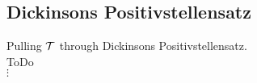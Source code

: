 \documentclass[./main.tex]{subfiles}
\begin{document}
\subsection{Dickinsons Positivstellensatz}
Pulling $\mathcal{T}$ through Dickinsons Positivstellensatz.\\
ToDo\\
$\vdots$



 
\end{document}
